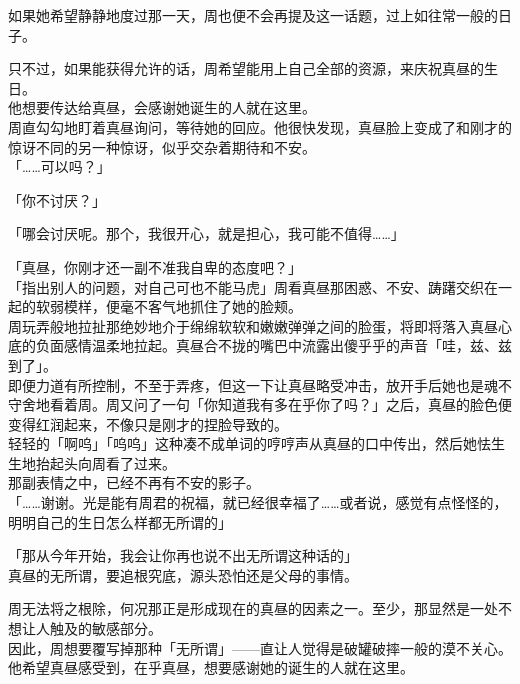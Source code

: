 如果她希望静静地度过那一天，周也便不会再提及这一话题，过上如往常一般的日子。

只不过，如果能获得允许的话，周希望能用上自己全部的资源，来庆祝真昼的生日。\\

他想要传达给真昼，会感谢她诞生的人就在这里。\\

周直勾勾地盯着真昼询问，等待她的回应。他很快发现，真昼脸上变成了和刚才的惊讶不同的另一种惊讶，似乎交杂着期待和不安。\\

「……可以吗？」

「你不讨厌？」

「哪会讨厌呢。那个，我很开心，就是担心，我可能不值得……」

「真昼，你刚才还一副不准我自卑的态度吧？」\\

「指出别人的问题，对自己可也不能马虎」周看真昼那困惑、不安、踌躇交织在一起的软弱模样，便毫不客气地抓住了她的脸颊。\\

周玩弄般地拉扯那绝妙地介于绵绵软软和嫩嫩弹弹之间的脸蛋，将即将落入真昼心底的负面感情温柔地拉起。真昼合不拢的嘴巴中流露出傻乎乎的声音「哇，兹、兹到了」。\\

即便力道有所控制，不至于弄疼，但这一下让真昼略受冲击，放开手后她也是魂不守舍地看着周。周又问了一句「你知道我有多在乎你了吗？」之后，真昼的脸色便变得红润起来，不像只是刚才的捏脸导致的。\\

轻轻的「啊呜」「呜呜」这种凑不成单词的哼哼声从真昼的口中传出，然后她怯生生地抬起头向周看了过来。\\

那副表情之中，已经不再有不安的影子。\\

「……谢谢。光是能有周君的祝福，就已经很幸福了……或者说，感觉有点怪怪的，明明自己的生日怎么样都无所谓的」

「那从今年开始，我会让你再也说不出无所谓这种话的」\\

真昼的无所谓，要追根究底，源头恐怕还是父母的事情。

周无法将之根除，何况那正是形成现在的真昼的因素之一。至少，那显然是一处不想让人触及的敏感部分。\\

因此，周想要覆写掉那种「无所谓」——直让人觉得是破罐破摔一般的漠不关心。他希望真昼感受到，在乎真昼，想要感谢她的诞生的人就在这里。\\

